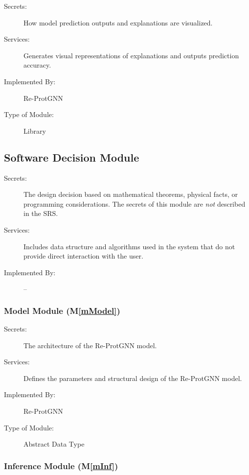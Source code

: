 \documentclass[12pt, titlepage]{article}
\newcommand{\mref}[1]{M\ref{#1}}
\begin{document}
\begin{description}
\item[Secrets:] How model prediction outputs and explanations are visualized.
\item[Services:] Generates visual representations of explanations and outputs prediction accuracy.

\item[Implemented By:] Re-ProtGNN
\item[Type of Module:] Library
\end{description}




\subsection{Software Decision Module}

\begin{description}
\item[Secrets:] The design decision based on mathematical theorems, physical
  facts, or programming considerations. The secrets of this module are
  \emph{not} described in the SRS.
\item[Services:] Includes data structure and algorithms used in the system that
  do not provide direct interaction with the user. 
\item[Implemented By:] --
\end{description}

\subsubsection{Model Module
 (\mref{mModel})}

\begin{description}
\item[Secrets:] The architecture of the Re-ProtGNN model.
\item[Services:] Defines the parameters and structural design of the Re-ProtGNN model.
\item[Implemented By:] Re-ProtGNN
\item[Type of Module:] Abstract Data Type
\end{description}


\subsubsection{Inference Module
 (\mref{mInf})}
\end{document}

